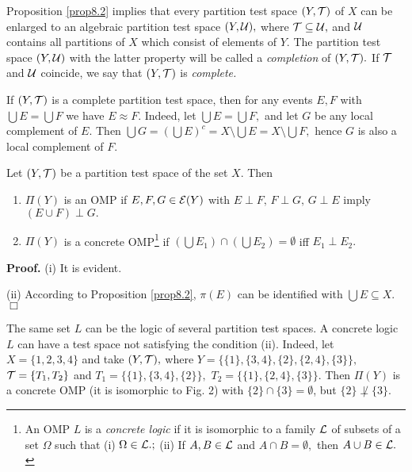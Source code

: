 Proposition \ref{prop8.2} implies that every partition test
space $(Y,{\cal T})$ of $X$ can be enlarged to an algebraic
partition test
space $(Y, {\cal U}),$ where ${\cal T} \subseteq {\cal U},$ and
$\cal U$
contains all partitions of $X$ which consist of elements of
$Y.$ The partition test space $(Y,{\cal U})$ with the latter
property will be called a {\it completion} of $(Y,{\cal T}).$ If
$\cal T$ and $\cal U$ coincide, we say that $(Y,{\cal T})$ is
{\it complete.}

If $(Y,{\cal T})$ is a complete partition test space, then for
any events $E,F$ with $\bigcup E = \bigcup F$ we have $E \approx F.$
Indeed, let $\bigcup E = \bigcup F,$ and let $G$ be any local
complement of $E.$ Then $\bigcup G = (\bigcup E)^c = X \setminus
\bigcup E = X \setminus \bigcup F,$ hence $G$ is also a local
complement of $F.$

\begin{proposition}\label{prop8.4} Let $(Y,{\cal T})$ be a
partition test space of the set $X.$ Then
\begin{enumerate}
\item[{\rm (i)}]  $\Pi(Y)$ is an OMP if $E,F,G \in {\cal E}(Y)$
with $E\perp F, \, F \perp G,\, G \perp E$ imply $(E \cup F)
\perp G.$
\item[{\rm (ii)}]   $\Pi(Y)$ is a concrete OMP\footnote{An OMP
$L$ is a {\it concrete logic} if it is isomorphic to a family
$ \cal L$ of subsets of a set $\Omega$ such that (i) $\Omega \in
{\cal L}.;$ (ii) If $A,B \in {\cal L}$ and $A \cap B =
\emptyset,$ then $A \cup B \in {\cal L}.$}
 if $(\bigcup E_1) \cap (\bigcup E_2) = \emptyset $ iff $E_1
\perp E_2.$
\end{enumerate}
\end{proposition}

{\bf Proof.} (i) It is evident.

(ii) According to Proposition \ref{prop8.2}, $\pi(E)$ can be identified
with $\bigcup E \subseteq X.$
\hfill $\Box$

\begin{remark}\label{rem8.5} The same set $L$ can be the logic
of several partition test spaces. A concrete logic $L$ can have
a test space not satisfying the condition (ii). Indeed, let $X =
\{1,2,3,4\}$ and take $(Y,{\cal T}),$ where $Y = \{\{1\},
\{3,4\}, \{2\}, \{2,4\}, \{3\}\},$ ${\cal T} = \{T_1, T_2\}$ and
$T_1 = \{\{1\}, \{3,4\}, \{2\}\},$ $T_2 =
\{\{1\}, \{2,4\}, \{3\}\}.$ Then $\Pi(Y)$ is a concrete OMP
(it is isomorphic to Fig. 2) with $\{2\} \cap \{3\} = \emptyset$,
but $\{2\} \not\perp \{3\}.$
\end{remark}

